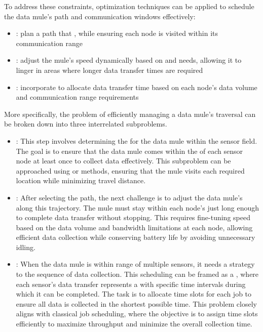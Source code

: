 \documentclass[a4paper, 12pt]{report}
\begin{document}
    To address these constraints, optimization techniques can be applied to schedule the data mule's path and communication windows effectively:

    \begin{itemize}
        \item {}: plan a path that , while ensuring each node is visited within its communication range
        \item {}: adjust the mule's speed dynamically based on  and  needs, allowing it to linger in areas where longer data transfer times are required
        \item {}: incorporate  to allocate data transfer time based on each node's data volume and communication range requirements
    \end{itemize}

    More specifically, the problem of efficiently managing a data mule's traversal can be broken down into three interrelated subproblems.

    \begin{itemize}
        \item {}: This step involves determining the  for the data mule within the sensor field. The goal is to ensure that the data mule comes within the  of each sensor node at least once to collect data effectively. This subproblem can be approached using  or  methods, ensuring that the mule visits each required location while minimizing travel distance.
        \item {}: After selecting the path, the next challenge is to adjust the data mule's  along this trajectory. The mule must stay within each node's  just long enough to complete data transfer without stopping. This requires fine-tuning speed based on the data volume and bandwidth limitations at each node, allowing efficient data collection while conserving battery life by avoiding unnecessary idling.
        \item {}: When the data mule is within range of multiple sensors, it needs a strategy to  the sequence of data collection. This scheduling can be framed as a , where each sensor's data transfer represents a  with specific time intervals during which it can be completed. The task is to allocate time slots for each job to ensure all data is collected in the shortest possible time. This problem closely aligns with classical job scheduling, where the objective is to assign time slots efficiently to maximize throughput and minimize the overall collection time.
    \end{itemize}
\end{document}
